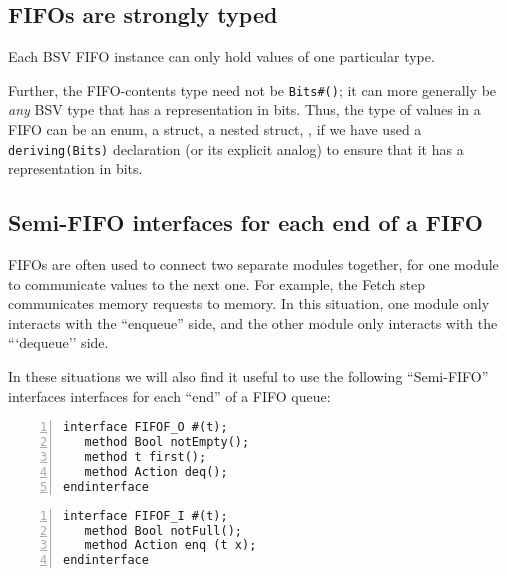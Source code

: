 
\subsection{FIFOs are strongly typed}


Each BSV FIFO instance can only hold values of one particular type.

Further, the FIFO-contents type need not be \verb|Bits#()|; it can
more generally be \emph{any} BSV type that has a representation in
bits.  Thus, the type of values in a FIFO can be an enum, a struct, a
nested struct, {\etc}, if we have used a \verb|deriving(Bits)|
declaration (or its explicit analog) to ensure that it has a
representation in bits.


\subsection{Semi-FIFO interfaces for each end of a FIFO}

FIFOs are often used to connect two separate modules together, for one
module to communicate values to the next one.  For example, the Fetch
step communicates memory requests to memory.  In this situation, one
module only interacts with the ``enqueue'' side, and the other module
only interacts with the ```dequeue'' side.

In these situations we will also find it useful to use the following
``Semi-FIFO'' interfaces interfaces for each ``end'' of a FIFO queue:


{\small
\begin{Verbatim}[frame=single, numbers=left]
interface FIFOF_O #(t);
   method Bool notEmpty();
   method t first();
   method Action deq();
endinterface
\end{Verbatim}
}


{\small
\begin{Verbatim}[frame=single, numbers=left]
interface FIFOF_I #(t);
   method Bool notFull();
   method Action enq (t x);
endinterface
\end{Verbatim}
}

